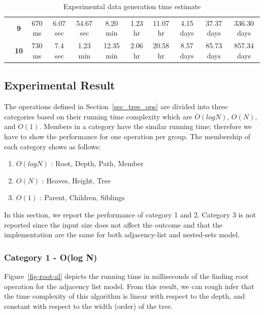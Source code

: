 \begin{table}[h]
\begin{tabular}{cc|c|c|c|c|c|c|c|c|c|}
\multicolumn{1}{|c}{\textbf{}}                       & \multicolumn{1}{|c|}{\textbf{9}}  & 670 ms     & 6.07 sec   & 54.67 sec  & 8.20 min   & 1.23 hr    & 11.07 hr   & 4.15 days  & 37.37 days & 336.30 days \\ \cline{2-11} 
\multicolumn{1}{|c}{\textbf{}}                       & \multicolumn{1}{|c|}{\textbf{10}} & 730 ms     & 7.4 sec    & 1.23 min   & 12.35 min  & 2.06 hr    & 20.58 hr   & 8.57 days  & 85.73 days & 857.34 days \\ \hline
\end{tabular}
\caption{Experimental data generation time estimate}
\label{tb_rel_data_gentime_est}
\end{table}


\subsection{Experimental Result}\label{sec_rt_eval_result}

The operations defined in Section~\ref{sec_tree_ops} are divided into three categories based on their running time complexity which are $O(log N)$, $O(N)$, and $O(1)$. Members in a category have the similar running time; therefore we have to show the performance for one operation per group. The membership of each category shows as follows:

\begin{enumerate}
\item $O(log N)$ : Root, Depth, Path, Member
\item $O(N)$ : Heaves, Height, Tree
\item $O(1)$ : Parent, Children, Siblings
\end{enumerate}

In this section, we report the performance of category 1 and 2. Category 3 is not reported since the input size does not affect the outcome and that the implementation are the same for both adjacency-list and nested-sets model.

\subsubsection{Category 1 - O(log N)}\label{eval_group1}

Figure~\ref{fig-root-al} depicts the running time in milliseconds of the finding root operation for the adjacency list model. From this result, we can rough infer that the time complexity of this algorithm is linear with respect to the depth, and constant with respect to the width (order) of the tree.

